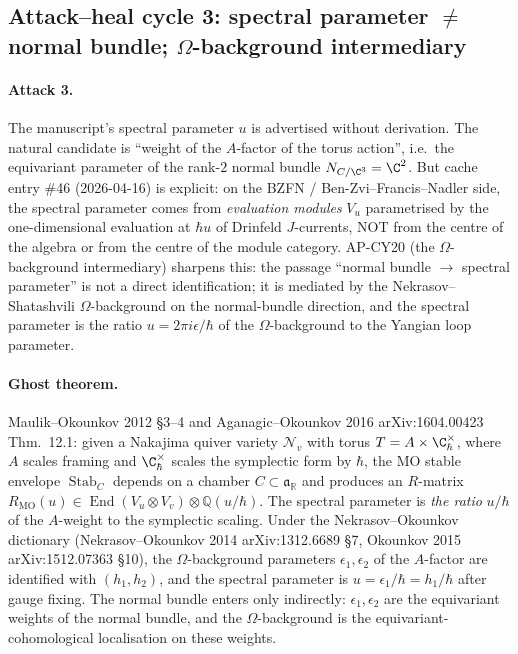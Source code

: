 \subsection*{Attack--heal cycle 3: spectral parameter $\neq$ normal
bundle; $\Omega$-background intermediary}

\paragraph{Attack 3.}  The manuscript's spectral parameter $u$
is advertised without derivation.  The natural candidate is
``weight of the $A$-factor of the torus action'', i.e.\ the equivariant
parameter of the rank-$2$ normal bundle $N_{C/\C^3} = \C^2$.  But
cache entry \#46 (2026-04-16) is explicit: on the
BZFN / Ben-Zvi--Francis--Nadler side, the spectral parameter comes
from \emph{evaluation modules} $V_u$ parametrised by the one-dimensional
evaluation at $\hbar u$ of Drinfeld $J$-currents, NOT from the
centre of the algebra or from the centre of the module category.
AP-CY20 (the $\Omega$-background intermediary) sharpens this: the
passage ``normal bundle $\to$ spectral parameter'' is not a direct
identification; it is mediated by the Nekrasov--Shatashvili
$\Omega$-background on the normal-bundle direction, and the spectral
parameter is the ratio $u = 2\pi i \epsilon/\hbar$ of the
$\Omega$-background to the Yangian loop parameter.

\paragraph{Ghost theorem.}  Maulik--Okounkov 2012 \S3--4 and
Aganagic--Okounkov 2016 arXiv:1604.00423 Thm.~12.1:
given a Nakajima quiver variety $\mathcal N_v$ with torus
$T = A\times\C^\times_\hbar$, where $A$ scales framing and
$\C^\times_\hbar$ scales the symplectic form by $\hbar$, the
MO stable envelope $\operatorname{Stab}_C$ depends on a chamber
$C \subset\mathfrak a_{\mathbb R}$ and produces an $R$-matrix
$R_{\mathrm{MO}}(u)\in\operatorname{End}(V_u\otimes V_v)\otimes
\mathbb Q(u/\hbar)$.  The spectral parameter is
\emph{the ratio} $u/\hbar$ of the $A$-weight to the symplectic
scaling.  Under the Nekrasov--Okounkov dictionary
(Nekrasov--Okounkov 2014 arXiv:1312.6689 \S7, Okounkov 2015
arXiv:1512.07363 \S10), the $\Omega$-background parameters
$\epsilon_1, \epsilon_2$ of the $A$-factor are identified with
$(h_1, h_2)$, and the spectral parameter is
$u = \epsilon_1/\hbar = h_1/\hbar$ after gauge fixing.
The normal bundle enters only indirectly: $\epsilon_1, \epsilon_2$
are the equivariant weights of the normal bundle, and the
$\Omega$-background is the equivariant-cohomological localisation on
these weights.

